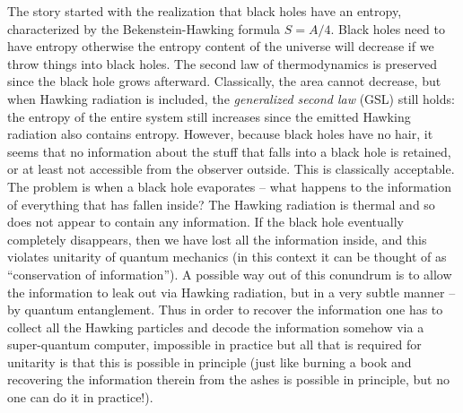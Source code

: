 \documentclass[12pt,preprintnumbers, floatfix, preprintnumbers, letterpaper, superscriptaddress,nofootinbib]{revtex4-2}
\begin{document}
The story started with the realization that black holes have an entropy, characterized by the Bekenstein-Hawking formula $S=A/4$. Black holes need to have entropy otherwise the entropy content of the universe will decrease if we throw things into black holes. The second law of thermodynamics is preserved since the black hole grows afterward. Classically, the area cannot decrease, but when Hawking radiation is included, the \emph{generalized second law} (GSL) still holds: the entropy of the entire system still increases since the emitted Hawking radiation also contains entropy. However, because black holes have no hair, it seems that no information about the stuff that falls into a black hole is retained, or at least not accessible from the observer outside. This is classically acceptable. The problem is when a black hole evaporates -- what happens to the information of everything that has fallen inside? The Hawking radiation is thermal and so does not appear to contain any information. If the black hole eventually completely disappears, then we have lost all the information inside, and this violates unitarity of quantum mechanics (in this context it can be thought of as ``conservation of information''). A possible way out of this conundrum is to allow the information to leak out via Hawking radiation, but in a very subtle manner -- by quantum entanglement. Thus in order to recover the information one has to collect all the Hawking particles and decode the information somehow via a super-quantum computer, impossible in practice but all that is required for unitarity is that this is possible in principle (just like burning a book and recovering the information therein from the ashes is possible in principle, but no one can do it in practice!). 
\end{document}
